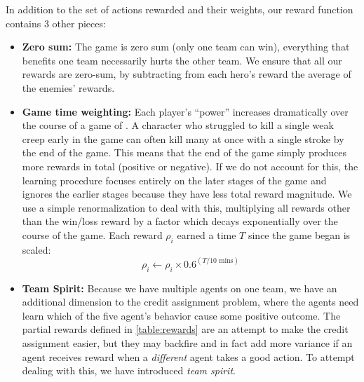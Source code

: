 \documentclass[ocean-paper.tex]{subfiles}
\begin{document}
In addition to the set of actions rewarded and their weights, our reward function contains 3 other pieces: 
\begin{itemize}
    \item \textbf{Zero sum: } The game is zero sum (only one team can win), everything that benefits one team necessarily hurts the other team. We ensure that all our rewards are zero-sum, by subtracting from each hero's reward the average of the enemies' rewards.
    \item \textbf{Game time weighting: } Each player's ``power'' increases dramatically over the course of a game of \dota. 
    A character who struggled to kill a single weak creep early in the game can often kill many at once with a single stroke by the end of the game. This means that the end of the game simply produces more rewards in total (positive or negative). 
    If we do not account for this, the learning procedure focuses entirely on the later stages of the game and ignores the earlier stages because they have less total reward magnitude. 
    We use a simple renormalization to deal with this, multiplying all rewards other than the win/loss reward by a factor which decays exponentially over the course of the game. Each reward $\rho_i$ earned a time $T$ since the game began is scaled:
    \begin{equation}
        \rho_i \leftarrow \rho_i \times 0.6^{(T/\textrm{10 mins})}
    \end{equation}
    \item \textbf{Team Spirit: }
    Because we have multiple agents on one team, we have an additional dimension to the credit assignment problem, where the agents need learn which of the five agent's behavior cause some positive outcome.
    The partial rewards defined in \autoref{table:rewards} are an attempt to make the credit assignment easier, but they may backfire and in fact add more variance if an agent receives reward when a \emph{different} agent takes a good action.
    To attempt dealing with this, we have introduced {\it team spirit}.

\end{itemize}
\end{document}
